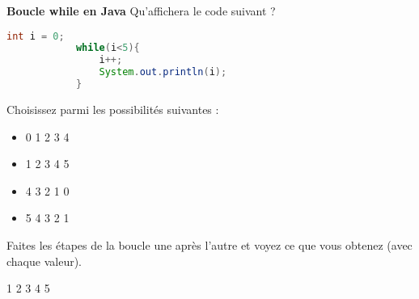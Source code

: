     
    \begin{Exercice}[5 minutes] \textbf{Boucle while en Java}
      	Qu'affichera le code suivant ?
      	
      	\begin{lstlisting}[language=Java]
            int i = 0;
            while(i<5){
            	i++;
            	System.out.println(i);
            }
     	\end{lstlisting}
             	
        Choisissez parmi les possibilités suivantes :
        
        \begin{itemize}
        
        \item 0 
        1 
        2 
        3 
        4 
        \item 1  
        2 
        3 
        4 
        5 
        \item 4 
        3 
        2 
        1 
        0 
        \item 5 
        4 
        3 
        2 
        1
        \end{itemize}
    
        \begin{conseil}
		   Faites les étapes de la boucle une après l'autre et voyez ce que vous obtenez (avec chaque valeur).  
        \end{conseil}
        
        \begin{solution}
            1 
            2 
            3 
            4 
            5
        \end{solution}
    \end{Exercice} 
	
